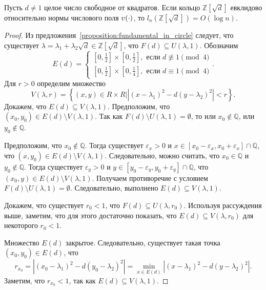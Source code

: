 \documentclass[_00_dissertation.tex]{subfiles}
\begin{document}
\begin{theorem}
    Пусть $d \neq 1$ целое число свободное от квадратов.
    Если кольцо $\mathbb{Z}[\sqrt{d}]$ евклидово относительно нормы числового поля $\upsilon(\cdot)$, то $l_n(\mathbb{Z}[\sqrt{d}]) = O(\log n)$.
\end{theorem}
\begin{proof}
    Из предложения~\ref{proposition:fundamental_in_circle} следует, что существует $\lambda = \lambda_1 + \lambda_2 \sqrt{d} \in \mathbb{Z}[\sqrt{d}]$, что $F(d) \subseteq U(\lambda, 1)$.
    Обозначим
    \begin{equation*}
        E(d) = \left\{\begin{split}
            \left[0, \frac{1}{2}\right] \times \left[0, \frac{1}{2}\right], \textrm{ если } d \not\equiv 1 \pmod 4\\
            \left[0, \frac{1}{2}\right] \times \left[0, \frac{1}{4}\right], \textrm{ если } d \equiv 1 \pmod 4
        \end{split}\right..
    \end{equation*}
    Для $r > 0$ определим множество
    \begin{equation*}
        V(\lambda, r) = \left\{
            (x, y) \in R \times R \Big| \left|(x - \lambda_1)^2 - d(y - \lambda_2)^2\right| < r
        \right\}.
    \end{equation*}
    Докажем, что $E(d) \subseteq V(\lambda, 1)$.
    Предположим, что $(x_0, y_0) \in E(d) \setminus V(\lambda, 1)$.
    Так как $F(d) \setminus U(\lambda, 1) = \emptyset$, то или $x_0 \not\in \mathbb{Q}$, или $y_0 \not\in \mathbb{Q}$.

    Предположим, что $x_0 \not\in \mathbb{Q}$.
    Тогда существует $\varepsilon_x > 0$ и $x \in [x_0 - \varepsilon_x, x_0 + \varepsilon_x] \cap \mathbb{Q}$, что $(x, y_0) \in E(d) \setminus V(\lambda, 1)$.
    Следовательно, можно считать, что $x_0 \in \mathbb{Q}$ и $y_0 \not\in \mathbb{Q}$.
    Тогда существует $\varepsilon_y > 0$ и $y \in [y_0 - \varepsilon_y, y_0 + \varepsilon_y] \cap \mathbb{Q}$, что $(x_0, y) \in E(d) \setminus V(\lambda, 1)$.
    Получаем противоречие с условием $F(d) \setminus U(\lambda, 1) = \emptyset$.
    Следовательно, выполнено $E(d) \subseteq V(\lambda, 1)$.

    Докажем, что существует $r_0 < 1$, что $F(d) \subseteq U(\lambda, r_0)$.
    Используя рассуждения выше, заметим, что для этого достаточно показать, что $E(d) \subseteq V(\lambda, r_0)$ для некоторого $r_0 < 1$.
    
    Множество $E(d)$ закрытое.
    Следовательно, существует такая точка $(x_0, y_0) \in E(d)$, что
    \begin{equation*}
        r_{x_0} = \left|(x_0 - \lambda_1)^2 - d(y_0 - \lambda_2)^2\right| = \min_{x \in E(d)} \left|(x - \lambda_1)^2 - d(y - \lambda_2)^2\right|.
    \end{equation*}
    Заметим, что $r_{x_0} < 1$, так как $E(d) \subseteq V(\lambda, 1)$.


\end{proof}
\end{document}
